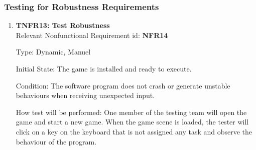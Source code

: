 \documentclass[12pt, titlepage]{article}
\begin{document}
\subsubsection{Testing for Robustness Requirements}
\begin{enumerate}
\item{\textbf{TNFR13: Test Robustness \\}}
Relevant Nonfunctional Requirement id: \textbf{NFR14}

Type: Dynamic, Manuel

Initial State: The game is installed and ready to execute.

Condition: The software program does not crash or generate unstable behaviours when receiving unexpected input.

How test will be performed: One member of the testing team will open the game and start a new game. When the game scene is loaded, the tester will click on a key on the keyboard that is not assigned any task and observe the behaviour of the program.





\end{enumerate}
\end{document}
